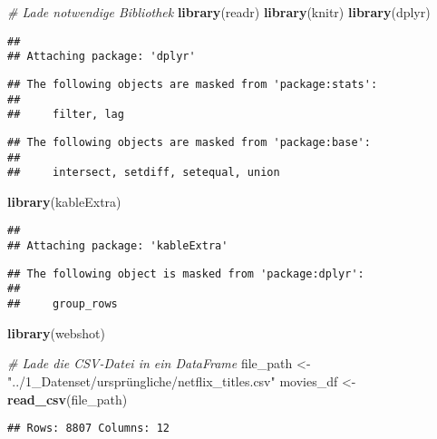 \documentclass[
]{article}
\author{}
\date{\vspace{-2.5em}}
\newenvironment{Shaded}{\begin{snugshade}}{\end{snugshade}}
\newcommand{\CommentTok}[1]{\textcolor[rgb]{0.56,0.35,0.01}{\textit{#1}}}
\newcommand{\FunctionTok}[1]{\textcolor[rgb]{0.13,0.29,0.53}{\textbf{#1}}}
\newcommand{\NormalTok}[1]{#1}
\newcommand{\OtherTok}[1]{\textcolor[rgb]{0.56,0.35,0.01}{#1}}
\newcommand{\StringTok}[1]{\textcolor[rgb]{0.31,0.60,0.02}{#1}}
\begin{document}
\begin{Shaded}
\begin{Highlighting}[]
\CommentTok{\# Lade notwendige Bibliothek}
\FunctionTok{library}\NormalTok{(readr)}
\FunctionTok{library}\NormalTok{(knitr)}
\FunctionTok{library}\NormalTok{(dplyr)}
\end{Highlighting}
\end{Shaded}

\begin{verbatim}
## 
## Attaching package: 'dplyr'
\end{verbatim}

\begin{verbatim}
## The following objects are masked from 'package:stats':
## 
##     filter, lag
\end{verbatim}

\begin{verbatim}
## The following objects are masked from 'package:base':
## 
##     intersect, setdiff, setequal, union
\end{verbatim}

\begin{Shaded}
\begin{Highlighting}[]
\FunctionTok{library}\NormalTok{(kableExtra)}
\end{Highlighting}
\end{Shaded}

\begin{verbatim}
## 
## Attaching package: 'kableExtra'
\end{verbatim}

\begin{verbatim}
## The following object is masked from 'package:dplyr':
## 
##     group_rows
\end{verbatim}

\begin{Shaded}
\begin{Highlighting}[]
\FunctionTok{library}\NormalTok{(webshot)}

\CommentTok{\# Lade die CSV{-}Datei in ein DataFrame}
\NormalTok{file\_path }\OtherTok{\textless{}{-}} \StringTok{"../1\_Datenset/ursprüngliche/netflix\_titles.csv"}
\NormalTok{movies\_df }\OtherTok{\textless{}{-}} \FunctionTok{read\_csv}\NormalTok{(file\_path)}
\end{Highlighting}
\end{Shaded}

\begin{verbatim}
## Rows: 8807 Columns: 12
\end{verbatim}
\end{document}
